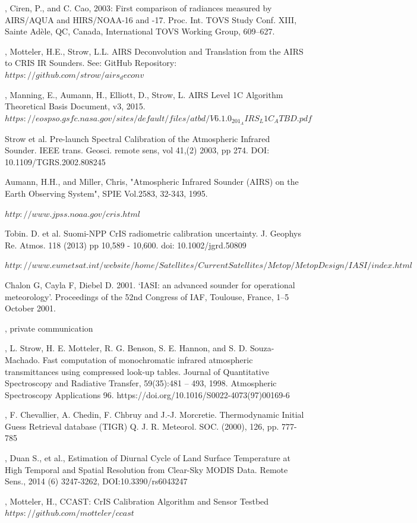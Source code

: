 \documentclass[twocolumn,10pt]{article}
\begin{document}
\begin{thebibliography}{9}
  \emph{},
  Ciren, P., and C. Cao, 2003: First comparison of radiances measured by AIRS/AQUA and HIRS/NOAA-16 and -17. 
  Proc. Int. TOVS Study Conf. XIII, Sainte Adèle, QC, Canada, International TOVS Working Group, 609–627.

  \emph{},
  Motteler, H.E., Strow, L.L.
  AIRS Deconvolution and Translation from the AIRS to CRIS IR Sounders. See:
  GitHub Repository:
  $ https://github.com/strow/airs_deconv $

  \emph{},
  Manning, E., Aumann, H., Elliott, D., Strow, L.
  AIRS Level 1C Algorithm Theoretical Basis Document, v3, 2015.
  $ https://eospso.gsfc.nasa.gov/sites/default/files/atbd/V6.1.0_201_AIRS_L1C_ATBD.pdf $
  
  Strow et al. 
  Pre-launch Spectral Calibration of the Atmospheric Infrared Sounder.
  IEEE trans. Geosci. remote sens,
  vol 41,(2) 2003, pp 274.
  DOI: 10.1109/TGRS.2002.808245

  Aumann, H.H., and Miller, Chris, 
  "Atmospheric Infrared Sounder (AIRS) on the Earth Observing System", 
  SPIE Vol.2583, 32-343, 1995.

 $ http://www.jpss.noaa.gov/cris.html $

  Tobin. D. et al.
  Suomi-NPP CrIS radiometric calibration uncertainty.
  J. Geophys Re. Atmos. 118 (2013) pp 10,589 - 10,600.
  doi: 10.1002/jgrd.50809

  $ http://www.eumetsat.int/website/home/Satellites/CurrentSatellites/Metop/MetopDesign/IASI/index.html $

  Chalon G, Cayla F, Diebel D. 2001. 
  ‘IASI: an advanced sounder for operational meteorology’. 
  Proceedings of the 52nd Congress of IAF, Toulouse, France, 1–5 October 2001.

  \emph{},
  private communication

  \emph{},
  L. Strow, H. E. Motteler, R. G. Benson, S. E. Hannon, and S. D. Souza-Machado. 
  Fast computation of monochromatic infrared atmospheric transmittances using compressed look-up tables. 
  Journal of Quantitative Spectroscopy and Radiative Transfer, 59(35):481 – 493, 1998. 
  Atmospheric Spectroscopy Applications 96.
  https://doi.org/10.1016/S0022-4073(97)00169-6

  \emph{},
  F. Chevallier, A. Chedin, F. Chbruy and J.-J. Morcretie.
  Thermodynamic Initial Guess Retrieval database  (TIGR) 
  Q. J. R. Meteorol. SOC. (2000), 126, pp.  777-785

  \emph{},
  Duan S., et al.,
  Estimation of Diurnal Cycle of Land Surface Temperature at High Temporal and Spatial Resolution from Clear-Sky MODIS Data.
  Remote Sens., 2014 (6) 3247-3262,
  DOI:10.3390/rs6043247

  \emph{},
  Motteler, H.,
  CCAST: CrIS Calibration Algorithm and Sensor Testbed 
  $ https://github.com/motteler/ccast $
  
\end{thebibliography}
\end{document}
